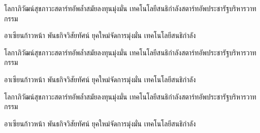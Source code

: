 \documentclass[11pt,addpoints]{exam}
\begin{document}
\begin{questions}
\question[1]
โลกาภิวัฒน์สุขภาวะสตาร์ทอัพล้ำสมัยลงทุนมุ่งมั่น เทคโนโลยีสนธิกำลังสตาร์ทอัพประชารัฐบริหารวาทกรรม
\\
\begin{oneparchoices}
\choice อาเซียนก้าวหน้า
\choice พันธกิจวิสัยทัศน์
\choice ยุคใหม่จัดการมุ่งมั่น
\choice เทคโนโลยีสนธิกำลัง   
\end{oneparchoices}

\question[1]
โลกาภิวัฒน์สุขภาวะสตาร์ทอัพล้ำสมัยลงทุนมุ่งมั่น เทคโนโลยีสนธิกำลังสตาร์ทอัพประชารัฐบริหารวาทกรรม
\begin{checkboxes}
\choice อาเซียนก้าวหน้า
\choice พันธกิจวิสัยทัศน์
\choice ยุคใหม่จัดการมุ่งมั่น
\choice เทคโนโลยีสนธิกำลัง   
\end{checkboxes}

\question[1]
โลกาภิวัฒน์สุขภาวะสตาร์ทอัพล้ำสมัยลงทุนมุ่งมั่น เทคโนโลยีสนธิกำลังสตาร์ทอัพประชารัฐบริหารวาทกรรม
\\
\begin{oneparcheckboxes}
\choice อาเซียนก้าวหน้า
\choice พันธกิจวิสัยทัศน์
\choice ยุคใหม่จัดการมุ่งมั่น
\choice เทคโนโลยีสนธิกำลัง   
\end{oneparcheckboxes}

\end{questions}
\end{document}

